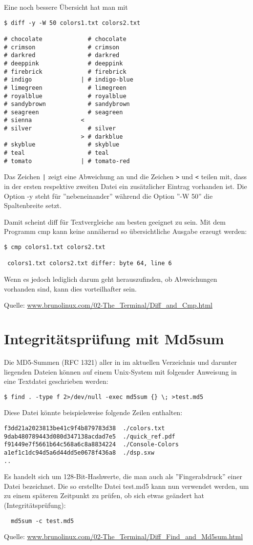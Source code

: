 \newslide
Eine noch bessere Übersicht hat man mit
\begin{lstlisting}
$ diff -y -W 50 colors1.txt colors2.txt

# chocolate             # chocolate
# crimson               # crimson
# darkred               # darkred
# deeppink              # deeppink
# firebrick             # firebrick
# indigo              | # indigo-blue
# limegreen             # limegreen
# royalblue             # royalblue
# sandybrown            # sandybrown
# seagreen              # seagreen
# sienna              <
# silver                # silver
                      > # darkblue
# skyblue               # skyblue
# teal                  # teal
# tomato              | # tomato-red
\end{lstlisting}
Das Zeichen \verb+|+ zeigt eine Abweichung an und die Zeichen
\verb+>+ und  \verb+<+ teilen mit, dass in der ersten
respektive zweiten Datei ein zusätzlicher
Eintrag vorhanden ist.
Die Option -y
steht für ''nebeneinander'' während die Option ''-W 50''
die Spaltenbreite setzt.

\newslide
Damit scheint diff für Textvergleiche am besten geeignet zu sein.
Mit dem Programm cmp kann keine annähernd so übersichtliche
Ausgabe erzeugt werden:
\begin{lstlisting}
$ cmp colors1.txt colors2.txt

 colors1.txt colors2.txt differ: byte 64, line 6
\end{lstlisting}
Wenn es jedoch lediglich darum geht herauszufinden, ob
Abweichungen vorhanden sind, kann dies vorteilhafter sein.

Quelle:
\href{http://www.brunolinux.com/02-The_Terminal/Diff_and_Cmp.html}
{www.brunolinux.com/02-The\_Terminal/Diff\_and\_Cmp.html}
\newslide
\section{Integritätsprüfung mit Md5sum}
Die MD5-Summen (RFC 1321)
aller in im aktuellen Verzeichnis und darunter
liegenden Dateien können auf einem Unix-System mit folgender Anweisung
in eine Textdatei geschrieben werden:
\begin{lstlisting}
$ find . -type f 2>/dev/null -exec md5sum {} \; >test.md5
\end{lstlisting}
Diese Datei könnte beispielsweise folgende Zeilen enthalten:
\begin{lstlisting}
f3dd21a2023813be41c9f4b879783d38  ./colors.txt
9dab480789443d080d347138acdad7e5  ./quick_ref.pdf
f91449e7f5661b64c568a6c8a8834224  ./Console-Colors
a1ef1c1dc94d5a6d44dd5e0678f436a8  ./dsp.sxw
..
\end{lstlisting}
\newslide
Es handelt sich um 128-Bit-Hashwerte, die man auch als
''Fingerabdruck'' einer Datei bezeichnet.
Die so erstellte Datei test.md5 kann nun verwendet werden,
um zu einem späteren Zeitpunkt
zu prüfen, ob sich etwas geändert hat (Integritätsprüfung):
\begin{lstlisting}
  md5sum -c test.md5
\end{lstlisting}
Quelle: \href{http://www.brunolinux.com/02-The_Terminal/Diff_Find_and_Md5sum.html}
  {www.brunolinux.com/02-The\_Terminal/Diff\_Find\_and\_Md5sum.html}
%
\newslide
